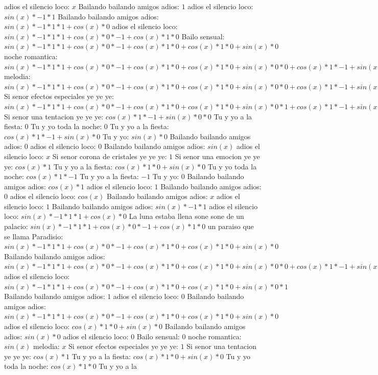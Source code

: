 \documentclass{article}
\begin{document}
adios el silencio loco: $x$ Bailando bailando amigos adios: $1$  \newline adios el silencio loco: $sin(x)*-1*1$ Bailando bailando amigos adios: $sin(x)*-1*1*1+cos(x)*0$ adios el silencio loco: ${sin(x)*-1*1*1+cos(x)*0}*-1+cos(x)*1*0$ Bailo sensual: ${sin(x)*-1*1*1+cos(x)*0}*-1+cos(x)*1*0+cos(x)*1*0+sin(x)*0$ noche romantica: ${{sin(x)*-1*1*1+cos(x)*0}*-1+cos(x)*1*0+cos(x)*1*0+sin(x)*0}*0+{cos(x)*1*-1+sin(x)*0}*0$ melodia: ${{sin(x)*-1*1*1+cos(x)*0}*-1+cos(x)*1*0+cos(x)*1*0+sin(x)*0}*0+{cos(x)*1*-1+sin(x)*0}*0+{cos(x)*1*-1+sin(x)*0}*0+sin(x)*-1*0$ Si senor efectos especiales ye ye ye: ${{sin(x)*-1*1*1+cos(x)*0}*-1+cos(x)*1*0+cos(x)*1*0+sin(x)*0}*1+{cos(x)*1*-1+sin(x)*0}*0$  \newline Si senor una tentacion ye ye ye: ${cos(x)*1*-1+sin(x)*0}*0$ Tu y yo a la fiesta: $0$ Tu y yo toda la noche: $0$  \newline Tu y yo a la fiesta: $cos(x)*1*-1+sin(x)*0$  \newline Tu y yo: $sin(x)*0$ Bailando bailando amigos adios: $0$ adios el silencio loco: $0$  \newline Bailando bailando amigos adios: $sin(x)$  \newline adios el silencio loco: $x$ Si senor corona de cristales ye ye ye: $1$  \newline Si senor una emocion ye ye ye: $cos(x)*1$ Tu y yo a la fiesta: $cos(x)*1*0+sin(x)*0$ Tu y yo toda la noche: $cos(x)*1*-1$ Tu y yo a la fiesta: $-1$ Tu y yo: $0$  \newline Bailando bailando amigos adios: $cos(x)*1$ adios el silencio loco: $1$ Bailando bailando amigos adios: $0$  \newline adios el silencio loco: $cos(x)$  \newline Bailando bailando amigos adios: $x$ adios el silencio loco: $1$  \newline Bailando bailando amigos adios: $sin(x)*-1*1$ adios el silencio loco: $sin(x)*-1*1*1+cos(x)*0$ La luna estaba llena sone sone de un palacio: ${sin(x)*-1*1*1+cos(x)*0}*-1+cos(x)*1*0$ un paraiso que se llama Paradisio: ${sin(x)*-1*1*1+cos(x)*0}*-1+cos(x)*1*0+cos(x)*1*0+sin(x)*0$ Bailando bailando amigos adios: ${{sin(x)*-1*1*1+cos(x)*0}*-1+cos(x)*1*0+cos(x)*1*0+sin(x)*0}*0+{cos(x)*1*-1+sin(x)*0}*0$ adios el silencio loco: ${{sin(x)*-1*1*1+cos(x)*0}*-1+cos(x)*1*0+cos(x)*1*0+sin(x)*0}*1$ Bailando bailando amigos adios: $1$ adios el silencio loco: $0$  \newline Bailando bailando amigos adios: ${sin(x)*-1*1*1+cos(x)*0}*-1+cos(x)*1*0+cos(x)*1*0+sin(x)*0$  \newline adios el silencio loco: $cos(x)*1*0+sin(x)*0$  \newline Bailando bailando amigos adios: $sin(x)*0$ adios el silencio loco: $0$ Bailo sensual: $0$  \newline noche romantica: $sin(x)$  \newline melodia: $x$ Si senor efectos especiales ye ye ye: $1$  \newline Si senor una tentacion ye ye ye: $cos(x)*1$ Tu y yo a la fiesta: $cos(x)*1*0+sin(x)*0$ Tu y yo toda la noche: $cos(x)*1*0$ Tu y yo a la 
\end{document}
